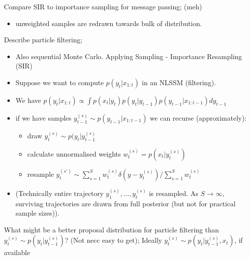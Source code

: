 \documentclass{article}
\begin{document}
Compare SIR to importance sampling for message passing; (meh) \begin{itemize} \item unweighted samples are redrawn tawards bulk of distribution. \end{itemize}

Describe particle filtering; \begin{itemize} \item Also sequential Monte Carlo. Applying Sampling - Importance Resampling (SIR) \item Suppose we want to compute $p(y_t | x_{1:t})$ in an NLSSM (filtering). \item We have $p(y_t|x_{1:t}) \propto \int p(x_t|y_t)p(y_t|y_{t-1})p(y_{t-1}|x_{1:t-1})dy_{t-1}$ \item if we have samples $y_{t-1}^{(s)}\sim p(y_{t-1}|x_{1:t-1})$ we can recurse (approximately): \begin{itemize} \item draw $y_t^{(s)} \sim p(y_t|y_{t-1}^{(s)}$ \item calculate unnormalised weights $w_t^{(s)}=p(x_t|y_t^{(s)})$ \item resample $y_t^{(s')} \sim \sum_{s=1}^S w_t^{(s)}\delta (y-y_t^{(s)})/\sum_{s=1}^Sw_t^{(s)}$ \end{itemize} \item (Technically entire trajectory $y_1^{(s)}, ..., y_t^{(s)}$ is resampled. As $S\to\infty$, surviving trajectories are drawn from full posterior (but not for practical sample sizes)). \end{itemize}

What might be a better proposal distribution for particle filtering than $y^{(s)}_t \sim p(y_t|y^{(s)}_{t-1})$? (Not necc easy to get); Ideally $y^{(s)}_t \sim p(y_t|y^{(s)}_{t-1}, x_t)$, if available
\end{document}
